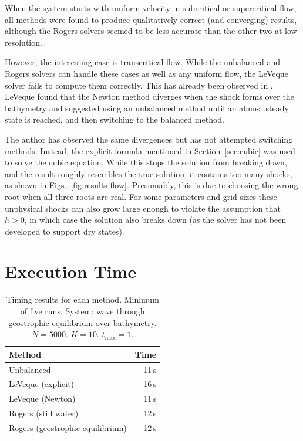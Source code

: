 When the system starts with uniform velocity in subcritical or supercritical flow, all methods were found to produce qualitatively correct (and converging) results, although the Rogers solvers seemed to be less accurate than the other two at low resolution.

However, the interesting case is transcritical flow. While the unbalanced and Rogers solvers can handle these cases as well as any uniform flow, the LeVeque solver fails to compute them correctly. This has already been observed in \cite{leveque1998balancing}. LeVeque found that the Newton method diverges when the shock forms over the bathymetry and suggested using an unbalanced method until an almost steady state is reached, and then switching to the balanced method.

The author has observed the same divergences but has not attempted switching methods. Instead, the explicit formula mentioned in Section~\ref{sec:cubic} was used to solve the cubic equation. While this stops the solution from breaking down, and the result roughly resembles the true solution, it contains too many shocks, as shown in Figs.~\ref{fig:results-flow}. Presumably, this is due to choosing the wrong root when all three roots are real. For some parameters and grid sizes these unphysical shocks can also grow large enough to violate the assumption that $h > 0$, in which case the solution also breaks down (as the solver has not been developed to support dry states).

\section{Execution Time}

\begin{table}
  \centering
  \begin{tabular}{lr}
    Method & Time \\
    \hline
    Unbalanced & 11\,s \\
    LeVeque (explicit) & 16\,s\\
    LeVeque (Newton) & 11\,s\\
    Rogers (still water) & 12\,s\\
    Rogers (geostrophic equilibrium) & 12\,s
  \end{tabular}
  \caption{Timing results for each method. Minimum of five runs. System: wave through geostrophic equilibrium over bathymetry. $N = 5000$. $K = 10$. $t_{\mathrm{max}} = 1$.}
  \label{tab:timing}
\end{table}

